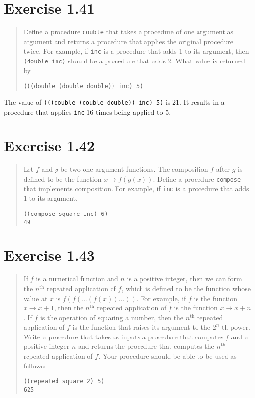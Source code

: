 \documentclass{article}
\begin{document}


\section{Exercise 1.41}
\begin{quote}
    Define a procedure \texttt{double} that takes a procedure of one argument
    as argument and returns a procedure that applies the original procedure
    twice. For example, if \texttt{inc} is a procedure that adds 1 to its
    argument, then \texttt{(double inc)} should be a procedure that adds 2.
    What value is returned by
    \begin{lstlisting}
(((double (double double)) inc) 5)
    \end{lstlisting}
\end{quote}



The value of \texttt{(((double (double double)) inc) 5)} is 21. It results in
a procedure that applies \texttt{inc} 16 times being applied to 5.

\section{Exercise 1.42}
\begin{quote}
    Let $f$ and $g$ be two one-argument functions. The composition $f$ after
    $g$ is defined to be the function $x\rightarrow f(g(x))$. Define a
    procedure \texttt{compose} that implements composition. For example, if
    \texttt{inc} is a procedure that adds 1 to its argument,
    \begin{lstlisting}
((compose square inc) 6)
49
    \end{lstlisting}
\end{quote}



\section{Exercise 1.43}
\begin{quote}
    If $f$ is a numerical function and $n$ is a positive integer, then we can
    form the $n^{\textrm{th}}$ repeated application of $f$, which is defined to
    be the function whose value at $x$ is $f(f(\ldots(f(x))\ldots))$. For
    example, if $f$ is the function $x\rightarrow x+1$, then the
    $n^{\textrm{th}}$ repeated application of $f$ is the function $x\rightarrow
    x+n$. If $f$ is the operation of squaring a number, then the
    $n^{\textrm{th}}$ repeated application of $f$ is the function that raises
    its argument to the $2^n$-th power. Write a procedure that takes as inputs
    a procedure that computes $f$ and a positive integer $n$ and returns the
    procedure that computes the $n^{\textrm{th}}$ repeated application of $f$.
    Your procedure should be able to be used as follows:
    \begin{lstlisting}
((repeated square 2) 5)
625
    \end{lstlisting}
\end{quote}


\end{document}

